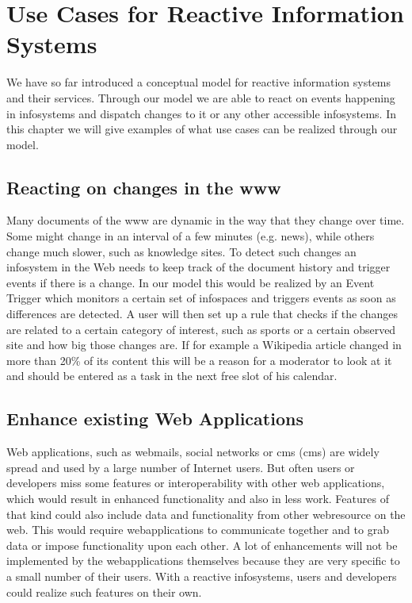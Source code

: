 

\chapter{Use Cases for Reactive Information Systems}
We have so far introduced a conceptual model for reactive information systems and their services.
Through our model we are able to react on events happening in \textrm{\glspl{infosystem}} and dispatch changes to it or any other accessible \textrm{\glspl{infosystem}}.
In this chapter we will give examples of what use cases can be realized through our model.

\section{Reacting on changes in the \gls{www}}
Many documents of the \textrm{\gls{www}} are dynamic in the way that they change over time.
Some might change in an interval of a few minutes (e.g. news), while others change much slower, such as knowledge sites.
To detect such changes an \textrm{\gls{infosystem}} in the Web needs to keep track of the document history and trigger events if there is a change.
In our model this would be realized by an \textrm{Event Trigger} which monitors a certain set of \textrm{\glspl{infospace}} and triggers events as soon as differences are detected.
A user will then set up a rule that checks if the changes are related to a certain category of interest, such as sports or a certain observed site and how big those changes are.
If for example a Wikipedia article changed in more than 20\% of its content this will be a reason for a moderator to look at it and should be entered as a task in the next free slot of his calendar.

\section{Enhance existing Web Applications}
Web applications, such as webmails, social networks or \textrm{\acrlong{cms} (\acrshort{cms})} are widely spread and used by a large number of Internet users.
But often users or developers miss some features or interoperability with other web applications, which would result in enhanced functionality and also in less work.
Features of that kind could also include data and functionality from other \textrm{\gls{webresource}} on the web.
This would require \textrm{\glspl{webapplication}} to communicate together and to grab data or impose functionality upon each other.
A lot of enhancements will not be implemented by the \textrm{\glspl{webapplication}} themselves because they are very specific to a small number of their users.
With a reactive \textrm{\glspl{infosystem}}, users and developers could realize such features on their own.


